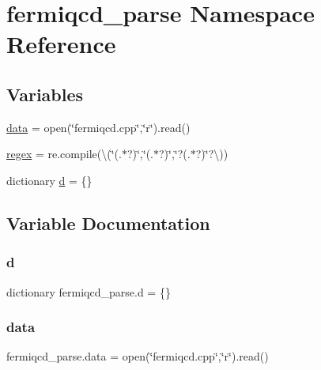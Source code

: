 \hypertarget{namespacefermiqcd__parse}{}\section{fermiqcd\+\_\+parse Namespace Reference}
\label{namespacefermiqcd__parse}
\subsection*{Variables}
\begin{DoxyCompactItemize}
\item 
\hyperlink{namespacefermiqcd__parse_a86479ef32cc399cf691f4924aa4ca690}{data} = open(\char`\"{}fermiqcd.\+cpp\char`\"{},\char`\"{}r\char`\"{}).read()
\item 
\hyperlink{namespacefermiqcd__parse_a138bf81b566ae24af8ee02b0e5dbcabe}{regex} = re.\+compile(\textquotesingle{}\textbackslash{}(\char`\"{}(.$\ast$?)\char`\"{},\char`\"{}(.$\ast$?)\char`\"{},\char`\"{}?(.$\ast$?)\char`\"{}?\textbackslash{})\textquotesingle{})
\item 
dictionary \hyperlink{namespacefermiqcd__parse_a1cdb234bcd63fc1883dbf0924e14ad5b}{d} = \{\}
\end{DoxyCompactItemize}


\subsection{Variable Documentation}
\mbox{\label{namespacefermiqcd__parse_a1cdb234bcd63fc1883dbf0924e14ad5b}} 
\subsubsection{\texorpdfstring{d}{d}}
{\footnotesize\ttfamily dictionary fermiqcd\+\_\+parse.\+d = \{\}}

\mbox{\label{namespacefermiqcd__parse_a86479ef32cc399cf691f4924aa4ca690}} 
\subsubsection{\texorpdfstring{data}{data}}
{\footnotesize\ttfamily fermiqcd\+\_\+parse.\+data = open(\char`\"{}fermiqcd.\+cpp\char`\"{},\char`\"{}r\char`\"{}).read()}

